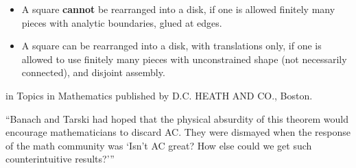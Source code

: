 \begin{itemize}

  \item A square {\bf cannot} be rearranged into a disk, if one is
  allowed finitely many pieces with analytic boundaries, glued at edges.
  \item A square can be rearranged into a disk, with translations only,
  if one is allowed to use finitely many pieces with unconstrained shape
  (not necessarily connected), and disjoint assembly.
\end{itemize}

\Ref

  {in
  Topics in Mathematics published by D.C. HEATH AND CO., Boston.}{}


``Banach and Tarski had hoped that the physical absurdity of this
theorem would encourage mathematicians to discard AC. They were dismayed
when the response of the math community was `Isn't AC great?  How else
could we get such counterintuitive results?'{}''
